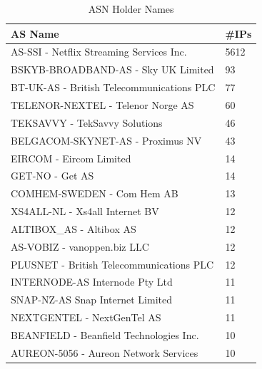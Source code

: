 \begin{table}[!h]
	\centering
	\caption{ASN Holder Names}
	\label{table:asnname}
	\begin{tabular}{lp{2cm}}
  		\toprule
  		\textbf{AS Name} & \textbf{\#IPs} \\ 
  		\midrule
		AS-SSI - Netflix Streaming Services Inc.      &                                  5612 \\
		BSKYB-BROADBAND-AS - Sky UK Limited             &                                  93 \\
		BT-UK-AS - British Telecommunications PLC       &                                  77 \\
		TELENOR-NEXTEL - Telenor Norge AS              &                                   60 \\
		TEKSAVVY - TekSavvy Solutions                 &                                    46 \\
		BELGACOM-SKYNET-AS - Proximus NV               &                                   43 \\
		EIRCOM - Eircom Limited                       &                                    14 \\
		GET-NO - Get AS                              &                                     14 \\
		COMHEM-SWEDEN - Com Hem AB                  &                                      13 \\
		XS4ALL-NL - Xs4all Internet BV              &                                      12 \\
		ALTIBOX\_AS - Altibox AS                         &                                  12 \\
		AS-VOBIZ - vanoppen.biz LLC                     &                                  12 \\
		PLUSNET - British Telecommunications PLC         &                                 12 \\
		INTERNODE-AS Internode Pty Ltd                   &                                 11 \\
		SNAP-NZ-AS Snap Internet Limited                 &                                 11 \\
		NEXTGENTEL - NextGenTel AS                       &                                 11 \\
		BEANFIELD - Beanfield Technologies Inc.          &                                 10 \\
		AUREON-5056 - Aureon Network Services            &                                 10 \\

\end{tabular}
\end{table}
